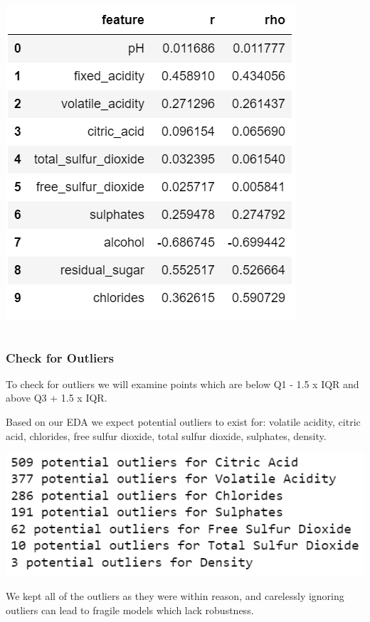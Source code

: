 \documentclass{beamer}
\begin{document}
\begin{frame}
\begin{footnotesize}
\begin{columns}
\begin{center}
					\includegraphics[height=.35\textheight]{images/density.png}
		\end{center}
			\end{columns}
					\end{footnotesize}
	\end{frame}
	
	
	\begin{frame}
		\frametitle{Check for Outliers}
		To check for outliers we will examine points which are below Q1 - 1.5 x IQR and above Q3 + 1.5 x IQR.  \par
		Based on our EDA we expect potential outliers to exist for:  volatile acidity, citric acid, chlorides, free sulfur dioxide, total sulfur dioxide, sulphates, density.  
		\begin{center}
		\includegraphics[height=.35\textheight]{images/outliers.png}
		\end{center}
		We kept all of the outliers as they were within reason, and carelessly ignoring outliers can lead to fragile models which lack robustness.
	\end{frame}
	
\end{document}

